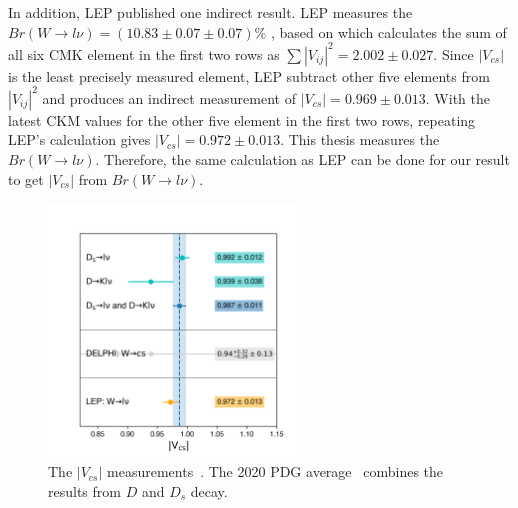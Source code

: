 In addition, LEP published one indirect result. LEP measures the $Br(W\to l \nu) = (10.83 \pm 0.07 \pm 0.07) \%$ \cite{Schael:2013ita}, based on which calculates the sum of all six CMK element in the first two rows as $\sum |V_{ij}|^2 = 2.002 \pm 0.027$. Since $|V_{cs}|$ is the least precisely measured element, LEP subtract other five elements from $|V_{ij}|^2 $ and produces an indirect measurement of $|V_{cs}|=0.969\pm 0.013$. With the latest CKM values for the other five element in the first two rows, repeating LEP's calculation gives $|V_{cs}|=0.972\pm 0.013$. This thesis measures the $Br(W\to l \nu)$. Therefore, the same calculation as LEP can be done for our result to get $|V_{cs}|$ from $Br(W\to l \nu)$.


 \begin{figure}
    \centering
    \includegraphics[width=0.6\textwidth]{chapters/RelatedWorks/sectionVcs/figures/vcs_world_average0.png}
    \caption{The $|V_{cs}|$ measurements~\cite{pdg2020}. The 2020 PDG average~\cite{pdg2020} combines the results from $D$ and $D_s$ decay.}
    \label{fig:relatedWorks:vcs:measurements}
\end{figure}





% 
